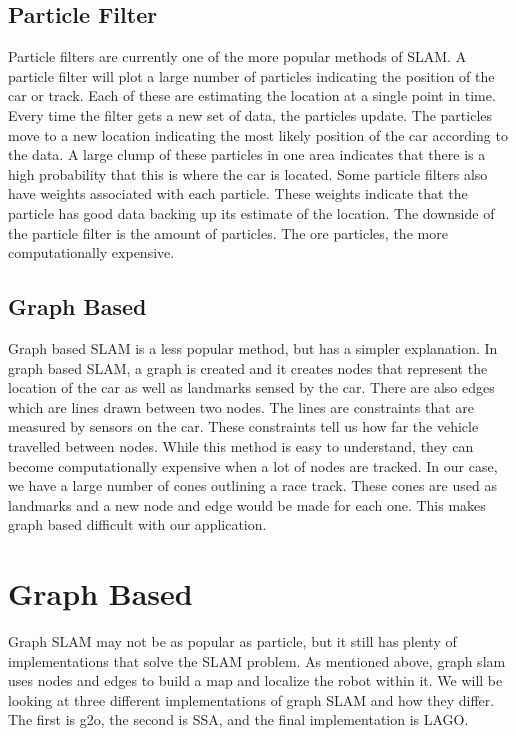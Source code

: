 \documentclass[10pt, onecolumn, draftclsnofoot, letterpaper,compsoc]{IEEEtran}
\begin{document}
\subsection{Particle Filter}
Particle filters are currently one of the more popular methods of SLAM. A particle filter will plot a large number of particles indicating the position of the car or track. Each of these are estimating the location at a single point in time. Every time the filter gets a new set of data, the particles update. The particles move to a new location indicating the most likely position of the car according to the data. A large clump of these particles in one area indicates that there is a high probability that this is where the car is located. Some particle filters also have weights associated with each particle. These weights indicate that the particle has good data backing up its estimate of the location. The downside of the particle filter is the amount of particles. The ore particles, the more computationally expensive.

\subsection{Graph Based}
Graph based SLAM is a less popular method, but has a simpler explanation. In graph based SLAM, a graph is created and it creates nodes that represent the location of the car as well as landmarks sensed by the car. There are also edges which are lines drawn between two nodes. The lines are constraints that are measured by sensors on the car. These constraints tell us how far the vehicle travelled between nodes\citep{graphslam}. While this method is easy to understand, they can become computationally expensive when a lot of nodes are tracked. In our case, we have a large number of cones outlining a race track. These cones are used as landmarks and a new node and edge would be made for each one. This makes graph based difficult with our application.

\section{Graph Based}
Graph SLAM may not be as popular as particle, but it still has plenty of implementations that solve the SLAM problem. As mentioned above, graph slam uses nodes and edges to build a map and localize the robot within it. We will be looking at three different implementations of graph SLAM and how they differ. The first is g2o, the second is SSA, and the final implementation is LAGO.
\end{document}
